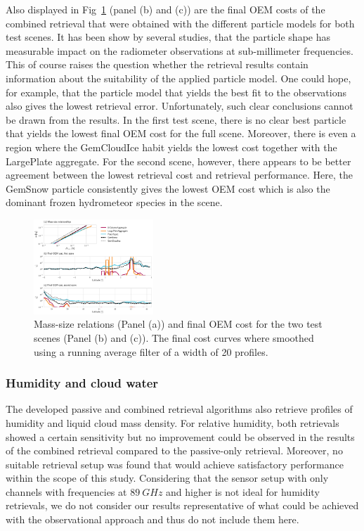 \documentclass[journal abbreviation, manuscript]{copernicus}
\begin{document}
Also displayed in Fig~\ref{fig:costs} (panel (b) and (c)) are the final OEM
costs of the combined retrieval that were obtained with the different particle
models for both test scenes. It has been show by several studies, that the
particle shape has measurable impact on the radiometer observations at
sub-millimeter frequencies. This of course raises the question whether the
retrieval results contain information about the suitability of the applied
particle model. One could hope, for example, that the particle model that
yields the best fit to the observations also gives the lowest retrieval error.
Unfortunately, such clear conclusions cannot be drawn from the results. 
In the first test scene, there is no clear best particle that yields the lowest
final OEM cost for the full scene. Moreover, there is even a region where the
GemCloudIce habit yields the lowest cost together with the LargePlate aggregate.
For the second scene, however, there appears to be better agreement between the lowest
retrieval cost and retrieval performance. Here, the GemSnow particle consistently
gives the lowest OEM cost which is also the dominant frozen hydrometeor species
in the scene.

\begin{figure}
\centering
\includegraphics[width = 0.4\textwidth]{../plots/costs}
\caption{Mass-size relations (Panel (a)) and final OEM cost for the two test scenes
  (Panel (b) and (c)). The final cost curves where smoothed using a running average filter
of a width of 20 profiles.}
\label{fig:costs}
\end{figure}


\subsubsection{Humidity and cloud water}

The developed passive and combined retrieval algorithms also retrieve profiles
of humidity and liquid cloud mass density. For relative humidity, both
retrievals showed a certain sensitivity but no improvement could be observed in
the results of the combined retrieval compared to the passive-only retrieval.
Moreover, no suitable retrieval setup was found that would achieve satisfactory
performance within the scope of this study. Considering that the sensor setup
with only channels with frequencies at $89\ \unit{GHz}$ and higher is not ideal for
humidity retrievals, we do not consider our results representative of what could
be achieved with the observational approach and thus do not include them here.
\end{document}
